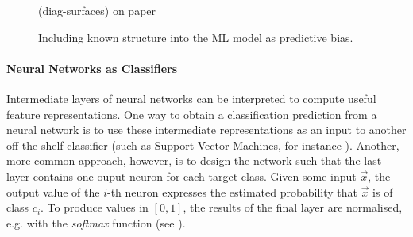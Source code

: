 \documentclass[
	fontsize=10pt, %
	twoside=false, %
	secnumdepth=1, %
  toc=indentunnumbered %
]{kaobook}
\begin{document}



\begin{figure}[h]
  \centering
  (diag-surfaces) on paper
  \caption{Including known structure into the ML model as predictive bias.}
  \label{fig:diag-surfaces}
\end{figure}









\paragraph{Neural Networks as Classifiers} Intermediate layers of neural
networks can be interpreted to compute useful feature representations. One way
to obtain a classification prediction from a neural network is to use these
intermediate representations as an input to another off-the-shelf classifier
(such as Support Vector Machines, for instance
\cite{liu_CombiningConvolutionalNeural_2018}). Another, more common approach,
however, is to design the network such that the last layer contains one ouput
neuron for each target class. Given some input $\vec x$, the output value of the
$i$-th neuron expresses the estimated probability that $\vec x$ is of class
$c_i$. To produce values in $[0,1]$, the results of the final layer are
normalised, e.g. with the \textit{softmax} function (see ).
\end{document}
